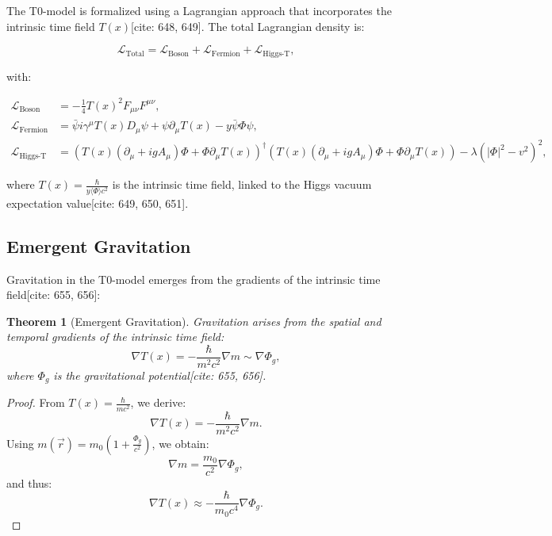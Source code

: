 \documentclass[a4paper,12pt]{article}
\newcommand{\Tfield}{T(x)}
\newcommand{\DcovT}[1]{\Tfield D_\mu #1 + #1 \partial_\mu \Tfield}
\newcommand{\DhiggsT}{\Tfield (\partial_\mu + ig A_\mu) \Phi + \Phi \partial_\mu \Tfield}
\newtheorem{theorem}{Theorem}[section]
\theoremstyle{definition}
\theoremstyle{remark}
\begin{document}
	The T0-model is formalized using a Lagrangian approach that incorporates the intrinsic time field \( \Tfield \)[cite: 648, 649]. The total Lagrangian density is:
	
	\begin{equation}
		\mathcal{L}_{\text{Total}} = \mathcal{L}_{\text{Boson}} + \mathcal{L}_{\text{Fermion}} + \mathcal{L}_{\text{Higgs-T}},
	\end{equation}
	
	with:
	
	\begin{align}
		\mathcal{L}_{\text{Boson}} &= -\frac{1}{4} \Tfield^2 F_{\mu\nu} F^{\mu\nu}, \\
		\mathcal{L}_{\text{Fermion}} &= \bar{\psi} i \gamma^\mu \DcovT{\psi} - y \bar{\psi} \Phi \psi, \\
		\mathcal{L}_{\text{Higgs-T}} &= (\DhiggsT)^\dagger (\DhiggsT) - \lambda (|\Phi|^2 - v^2)^2,
	\end{align}
	
	where \( \Tfield = \frac{\hbar}{y \langle \Phi \rangle c^2} \) is the intrinsic time field, linked to the Higgs vacuum expectation value[cite: 649, 650, 651].
	
	\subsection{Emergent Gravitation}
	
	Gravitation in the T0-model emerges from the gradients of the intrinsic time field[cite: 655, 656]:
	
	\begin{theorem}[Emergent Gravitation]
		Gravitation arises from the spatial and temporal gradients of the intrinsic time field:
		\begin{equation}
			\nabla \Tfield = -\frac{\hbar}{m^2 c^2} \nabla m \sim \nabla \Phi_g,
		\end{equation}
		where \( \Phi_g \) is the gravitational potential[cite: 655, 656].
	\end{theorem}
	
	\begin{proof}
		From \( \Tfield = \frac{\hbar}{m c^2} \), we derive:
		\begin{equation}
			\nabla \Tfield = -\frac{\hbar}{m^2 c^2} \nabla m.
		\end{equation}
		Using \( m(\vec{r}) = m_0 (1 + \frac{\Phi_g}{c^2}) \), we obtain:
		\begin{equation}
			\nabla m = \frac{m_0}{c^2} \nabla \Phi_g,
		\end{equation}
		and thus:
		\begin{equation}
			\nabla \Tfield \approx -\frac{\hbar}{m_0 c^4} \nabla \Phi_g.
		\end{equation}
	\end{proof}
	
\end{document}
